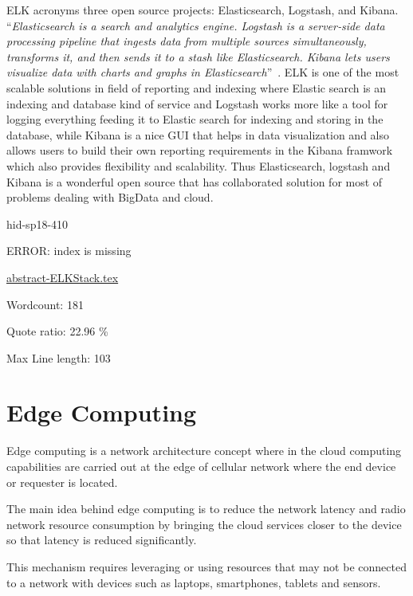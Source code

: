 ELK acronyms three open source projects: Elasticsearch, Logstash, 
and Kibana. \color{blue}``\emph{Elasticsearch is a search and analytics engine. Logstash is a 
server‑side data processing pipeline that ingests data from multiple sources 
simultaneously, transforms it, and then sends it to a stash like 
Elasticsearch. Kibana lets users visualize data with charts and graphs in 
Elasticsearch}''\color{black}~\cite{hid-sp18-410-ELKBlog}. ELK is one of the most scalable solutions in
field of reporting and indexing where Elastic search is an indexing and
database kind of service and Logstash works more like a tool for logging
everything feeding it to Elastic search for indexing and storing in 
the database, while Kibana is a nice GUI that helps in data visualization
and also allows users to build their own reporting requirements in the
Kibana framwork which also provides flexibility and scalability.
Thus Elasticsearch, logstash and Kibana is a wonderful open source that
has collaborated solution for most of problems dealing with BigData 
and cloud.



\begin{IU}

hid-sp18-410

ERROR: index is missing

\href{https://github.com/cloudmesh-community/hid-sp18-410/blob/master//technology/abstract-ELKStack.tex}{abstract-ELKStack.tex}

 

Wordcount: 181


Quote ratio: 22.96 \%
 
Max Line length: 103
\end{IU}

\section{Edge Computing}

Edge computing is a network architecture concept where in the cloud 
computing capabilities are carried out at the edge of cellular network
where the end device or requester is located.

The main idea behind edge computing is to reduce the network latency and
radio network resource consumption by bringing the cloud services closer
to the device so that latency is reduced significantly.

This mechanism requires leveraging or using resources that may not be 
connected to a network with devices such as laptops, smartphones, 
tablets and sensors.

